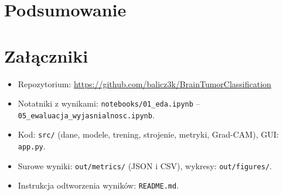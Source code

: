 \documentclass[11pt,a4paper]{article}
\begin{document}
\section{Podsumowanie}


\section{Załączniki}\label{sec:zal}
\begin{itemize}
\item Repozytorium: \url{https://github.com/balicz3k/BrainTumorClassification}
\item Notatniki z wynikami: \texttt{notebooks/01\_eda.ipynb} -- \texttt{05\_ewaluacja\_wyjasnialnosc.ipynb}.
\item Kod: \texttt{src/} (dane, modele, trening, strojenie, metryki, Grad-CAM), GUI: \texttt{app.py}.
\item Surowe wyniki: \texttt{out/metrics/} (JSON i CSV), wykresy: \texttt{out/figures/}.
\item Instrukcja odtworzenia wyników: \texttt{README.md}.
\end{itemize}
\end{document}
